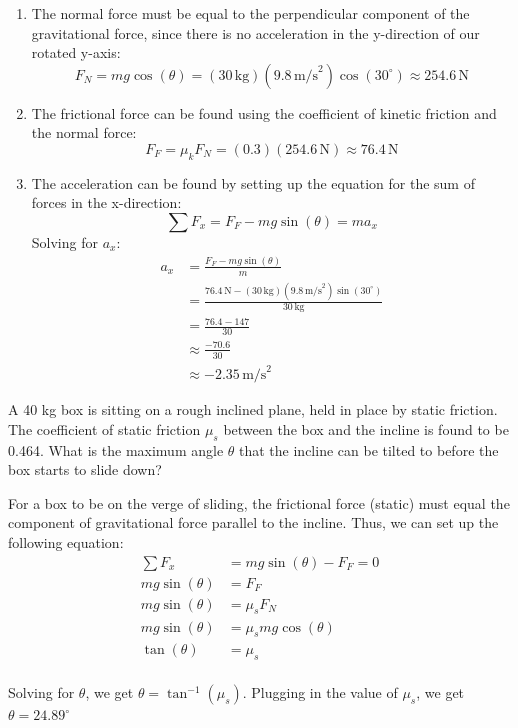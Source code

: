 \begin{Answer}[ref=incline1]
    \begin{enumerate}[label=(\alph*)]
        \item The normal force must be equal to the perpendicular component of the gravitational force, since there is no acceleration in the y-direction of our rotated y-axis:
        $$F_N = mg\cos(\theta) = (30\,\text{kg})(9.8\,\text{m/s}^2)\cos(30^\circ) \approx 254.6\,\text{N}$$
        \item The frictional force can be found using the coefficient of kinetic friction and the normal force:
        $$F_F = \mu_k F_N = (0.3)(254.6\,\text{N}) \approx 76.4\,\text{N}$$
        \item The acceleration can be found by setting up the equation for the sum of forces in the x-direction:
        $$\sum F_x = F_F - mg\sin(\theta)  = ma_x$$
        Solving for $a_x$:
        \begin{align*}
            a_x &= \frac{F_F - mg\sin(\theta)}{m} \\
            &= \frac{76.4\,\text{N} - (30\,\text{kg})(9.8\,\text{m/s}^2)\sin(30^\circ)}{30\,\text{kg}} \\
            &= \frac{76.4 - 147}{30} \\
            &\approx \frac{-70.6}{30} \\
            &\approx -2.35\,\text{m/s}^2 
        \end{align*}
    \end{enumerate}
\end{Answer}

\begin{Exercise}[title=Solving for angle $\theta$, label=incline2]
    A 40 kg box is sitting on a rough inclined plane, held in place by static friction. The coefficient of static friction $\mu_s$ between the box and the incline is found to be 0.464. What is the maximum angle $\theta$ that the incline can be tilted to before the box starts to slide down?
\end{Exercise}
\begin{Answer}[ref=incline2]
For a box to be on the verge of sliding, the frictional force (static) must equal the component of gravitational force parallel to the incline. Thus, we can set up the following equation:
\begin{align*}
    \sum F_x &= mg\sin(\theta) - F_F = 0 \\
    mg\sin(\theta) &= F_F \\
    mg\sin(\theta) &= \mu_s F_N \\
    mg\sin(\theta) &= \mu_s mg\cos(\theta) \\
    \tan(\theta) &= \mu_s \\
\end{align*}

Solving for $\theta$, we get $\theta = \tan^{-1}(\mu_s)$. 
Plugging in the value of $\mu_s$, we get $\theta = 24.89^\circ$
\end{Answer}

